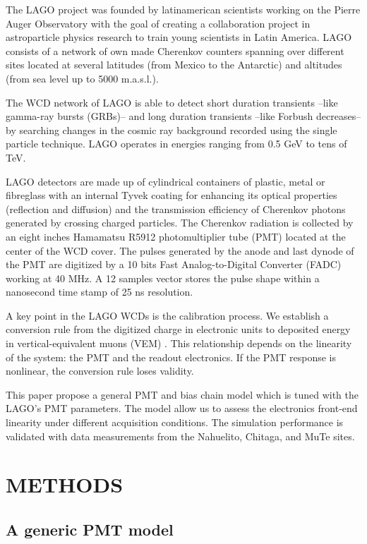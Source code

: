 \documentclass[letterpaper, 10 pt, conference]{ieeeconf}  %
\begin{document}
The LAGO project was founded by latinamerican scientists working on the Pierre Auger Observatory with the goal of creating a collaboration project in astroparticle physics research to train young scientists in Latin America. LAGO consists of a network of own made Cherenkov counters spanning over different sites located at several latitudes (from Mexico to the Antarctic) and altitudes (from sea level up to 5000 m.a.s.l.). 

The WCD network of LAGO is able to detect short duration transients --like gamma-ray bursts (GRBs)-- and long duration transients --like Forbush decreases-- \cite{Durn2016} by searching changes in the cosmic ray background recorded using the single particle technique. LAGO operates in energies ranging from 0.5 GeV to tens of TeV.

LAGO detectors are made up of cylindrical containers of plastic, metal or fibreglass with an internal Tyvek coating for enhancing its optical properties (reflection and diffusion) and the transmission efficiency of Cherenkov photons generated by crossing charged particles. The Cherenkov radiation is collected by an eight inches Hamamatsu R5912 photomultiplier tube (PMT) located at the center of the WCD cover. The pulses generated by the anode and last dynode of the PMT are digitized by a 10 bits Fast Analog-to-Digital Converter (FADC) working at 40 MHz. A 12 samples vector stores the pulse shape within a nanosecond time stamp of 25 ns resolution.

A key point in the LAGO WCDs is the calibration process. We establish a conversion rule from the digitized charge in electronic units to deposited energy in vertical-equivalent muons (VEM) \cite{Bertou2006, Galindo2017}. This relationship depends on the linearity of the system: the PMT and the readout electronics. If the PMT response is nonlinear, the conversion rule loses validity. 

This paper propose a general PMT and bias chain model which is tuned with the LAGO's PMT parameters. The model allow us to assess the electronics front-end linearity under different acquisition conditions. The simulation performance is validated with data measurements from the Nahuelito, Chitaga, and MuTe sites. 

\section{METHODS}

\subsection{A generic PMT model}
\end{document}
